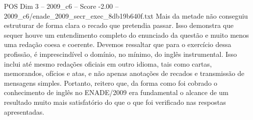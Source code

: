 \begin{textsample}{POS Dim 3 – 2009\_c6 – Score -2.00 – 2009\_c6/enade\_2009\_secr\_exec\_8db19b640f.txt}
Mais da metade não conseguiu estruturar de forma clara o recado que pretendia passar.
Isso demonstra que sequer houve um entendimento completo do enunciado da questão e muito menos uma redação coesa e coerente.
Devemos ressaltar que para o exercício dessa profissão, é imprescindível o domínio, no mínimo, do inglês instrumental.
Isso inclui até mesmo redações oficiais em outro idioma, tais como cartas, memorandos, ofícios e atas, e não apenas anotações de recados e transmissão de mensagens simples.
Portanto, reitero que, da forma como foi cobrado o conhecimento de inglês no ENADE/2009 era fundamental o alcance de um resultado muito mais satisfatório do que o que foi verificado nas respostas apresentadas.

\end{textsample}
